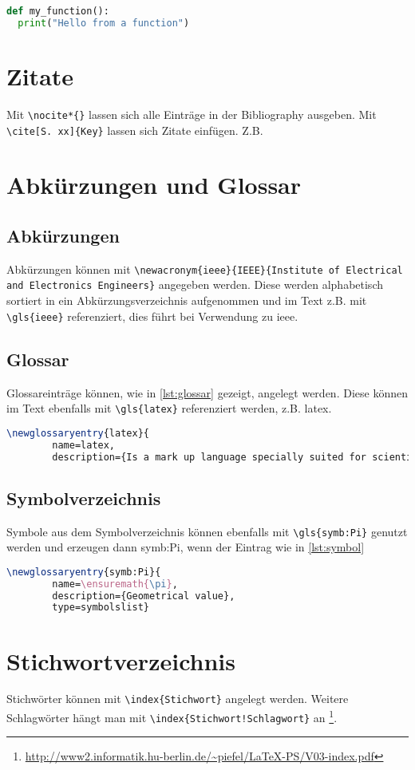 \begin{lstlisting}[language=Python, caption={Simple Python program}, label=lst:python]
def my_function():
  print("Hello from a function")
\end{lstlisting}

\section{Zitate}
Mit \lstinline|\nocite*{}| lassen sich alle Einträge in der Bibliography ausgeben. Mit \lstinline|\cite[S. xx]{Key}| lassen sich Zitate einfügen. Z.B. \cite[S. 234]{Kurose12} \nocite*{}

\section{Abkürzungen und Glossar}
\subsection{Abkürzungen}
Abkürzungen können mit \lstinline|\newacronym{ieee}{IEEE}{Institute of Electrical and Electronics Engineers}| angegeben werden. Diese werden alphabetisch sortiert in ein Abkürzungsverzeichnis aufgenommen und im Text z.B. mit \lstinline|\gls{ieee}| referenziert, dies führt bei Verwendung zu \gls{ieee}.

\subsection{Glossar}
Glossareinträge können, wie in \autoref{lst:glossar} gezeigt, angelegt werden. Diese können im Text ebenfalls mit \lstinline|\gls{latex}| referenziert werden, z.B. \gls{latex}.
\begin{lstlisting}[caption=Glossareinträge, label=lst:glossar, language=TeX]
 \newglossaryentry{latex}{
        name=latex,
        description={Is a mark up language specially suited for scientific documents}}
\end{lstlisting}

\subsection{Symbolverzeichnis}
Symbole aus dem Symbolverzeichnis können ebenfalls mit \lstinline|\gls{symb:Pi}| genutzt werden und erzeugen dann \gls{symb:Pi}, wenn der Eintrag wie in \autoref{lst:symbol}
\begin{lstlisting}[caption=Einträge für das Symbolverzeichnis, label=lst:symbol, language=TeX]
\newglossaryentry{symb:Pi}{
        name=\ensuremath{\pi},
        description={Geometrical value},
        type=symbolslist}
\end{lstlisting}

\section{Stichwortverzeichnis}
Stichwörter können mit \lstinline|\index{Stichwort}| angelegt werden. Weitere Schlagwörter hängt man mit \lstinline|\index{Stichwort!Schlagwort}| an \footnote{\url{http://www2.informatik.hu-berlin.de/~piefel/LaTeX-PS/V03-index.pdf}}.
